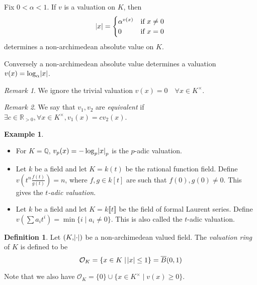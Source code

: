 \documentclass[11pt]{article}
\theoremstyle{definition}
\newtheorem{definition}{Definition}[subsection]
\newtheorem*{example}{Example}
\theoremstyle{plain}
\theoremstyle{remark}
\newtheorem*{remark}{Remark}
\newcommand{\bQ}{\mathbb{Q}}
\newcommand{\bR}{\mathbb{R}}
\newcommand{\cO}{\mathcal{O}}
\begin{document}
\noindent Fix $0 < \alpha < 1$. If $v$ is a valuation on $K$, then
\begin{equation*}
    \abs{x} =
    \begin{cases}
        \alpha^{v(x)} & \text{if } x \neq 0\\
        0 & \text{if } x = 0
    \end{cases}
\end{equation*}
determines a non-archimedean absolute value on $K$.

Conversely a non-archimedean absolute value determines a valuation $v(x) = \log_\alpha \abs{x}$.

\begin{remark}
    We ignore the trivial valuation $v(x) = 0 \quad \forall x \in K^\times$.
\end{remark}
\begin{remark}
    We say that $v_1, v_2$ are \emph{equivalent} if $\exists c \in \bR_{> 0}, \forall x \in K^\times, v_1(x) = c v_2(x)$.
\end{remark}

\begin{example}\phantom{}
    \begin{itemize}
        \item For $K = \bQ$, $v_p(x) = -\log_p \abs{x}_p$ is the $p$-adic valuation.
        \item Let $k$ be a field and let $K = k(t)$ be the rational function field. Define $v(t^n \frac{f(t)}{g(t)}) = n$, where $f, g \in k[t]$ are such that $f(0), g(0) \neq 0$. This gives the \emph{$t$-adic valuation}.
        \item Let $k$ be a field and let $K = k \llbracket t \rrbracket$ be the field of formal Laurent series. Define $v(\sum a_i t^i) = \min \{i \mid a_i \neq 0\}$. This is also called the $t$-adic valuation.
    \end{itemize}
\end{example}

\begin{definition}
    Let $(K, \abs{\cdot})$ be a non-archimedean valued field. The \emph{valuation ring} of $K$ is defined to be
    \begin{equation*}
        \cO_K = \{x \in K \mid \abs{x} \le 1\} = \overline{B}(0, 1)
    \end{equation*}
\end{definition}
\noindent Note that we also have $\cO_K = \{0\} \cup \{x \in K^\times \mid v(x) \ge 0\}$.
\end{document}
